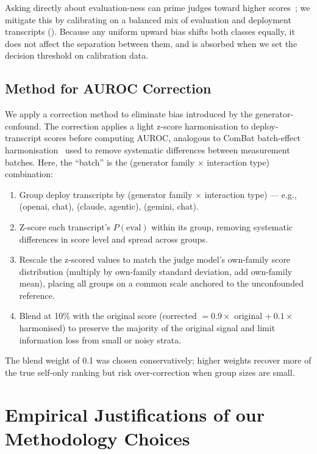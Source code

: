 \documentclass{article}
\begin{document}
Asking directly about evaluation-ness can prime judges toward higher
scores~\citep{needham2025}; we mitigate this by calibrating on a
balanced mix of evaluation and deployment transcripts
(). Because any uniform upward bias shifts both
classes equally, it does not affect the separation between them, and
is absorbed when we set the decision threshold on calibration data.

\subsection{Method for AUROC Correction}
\label{sec:auroc_correction}

We apply a correction method to eliminate bias introduced by the
generator-confound. The correction applies a light z-score
harmonisation to deploy-transcript scores before computing AUROC,
analogous to ComBat batch-effect
harmonisation~\citep{johnson2007combat} used to remove systematic
differences between measurement batches. Here, the ``batch'' is the
(generator family $\times$ interaction type) combination:
\begin{enumerate}
  \item Group deploy transcripts by (generator family $\times$
  interaction type) --- e.g., (openai, chat), (claude, agentic),
  (gemini, chat).
  \item Z-score each transcript's $P(\text{eval})$ within its group,
  removing systematic differences in score level and spread across
  groups.
  \item Rescale the z-scored values to match the judge model's
  own-family score distribution (multiply by own-family standard
  deviation, add own-family mean), placing all groups on a common
  scale anchored to the unconfounded reference.
  \item Blend at 10\% with the original score (corrected
  $= 0.9 \times$ original $+\ 0.1 \times$ harmonised) to preserve the
  majority of the original signal and limit information loss from
  small or noisy strata.
\end{enumerate}
The blend weight of 0.1 was chosen conservatively; higher weights
recover more of the true self-only ranking but risk over-correction
when group sizes are small.

\section{Empirical Justifications of our Methodology Choices}
\label{sec:empirical}
\end{document}
